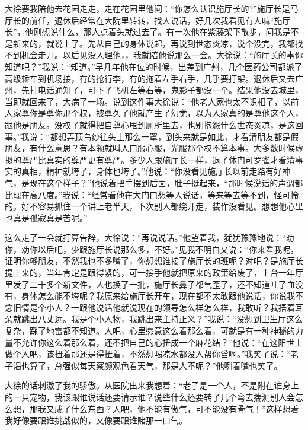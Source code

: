 \documentclass[12pt,oneside]{book}
\begin{document}
大徐要我陪他去花园走走，走在花园里他问：``你怎么认识施厅长的?''施厅长是马厅长的前任，退休后经常在大院里转转，找人说话，好几次我看见有人喊``施厅长''，他刚想说什么，那人点着头就过去了。有一次他在紫藤架下散步，问我是不是新来的，就说上了。先从自己的身体说起，再说到世态炎凉，说个没完，我都找不到机会走开。以后见没人理他，，我就陪他说那么一会。大徐说：``施厅长的事你知道吧？''我说：``知道。''早几年他在位的时候，出差到广州，几个医药公司都派了高级轿车到机场接，有的抢行李，有的拖着左手右手，几乎要打架。退休后又去广州，先打电话通知了，可下了飞机左等右等，鬼影子都没一个。结果他没去城里，当即就回来了，大病了一场。说到这件事大徐说：``他老人家也太不识相了，以前人家尊你是尊你那个权，被尊久了他就产生了幻觉，以为人家真的是尊他这个人，跟他是朋友。没权了就得把自尊心甩到厕所里去，也别抱怨什么世态炎凉，是这回事。''我说：``都想弄顶乌纱往头上那么一罩，到头来就是如此，才看清朋友都是假朋友，有什么意思？有本领就叫人口服心服，光服那个权不算本事。大多数时候虚拟的尊严比真实的尊严更有尊严。多少人跟施厅长一样，退了休门可罗雀才看清事实的真相，精神就垮了，身体也垮了。''他说：``你没看见施厅长以前走路有好神气，是现在这个样子？''他说着把手摆到后面，肚子挺起来，``那时候说话的声调都比现在高八度。''我说：``经常看他在大门口想等人说话，等来等去等不到，怪可怜的。好不容易抓住一个讲上老半天，下次别人都绕开走，装作没看见。想想他心里也真是孤寂真是苦呢。''

这么走了一会就打算告辞，大徐说：``再说说话。''他望着我，犹犹豫豫地说：``劝你，劝你以后吧，少跟施厅长说那么多，不好。''见我不明白又说：``你来看我呢，证明你够朋友，不然我也不多嘴了，你想想谁接了施厅长的班呢？对吧？是施厅长提上来的，当年肯定是跟得紧的，可一接手他就把原来的政策给废了，上台一年厅里发了二十多个新文件，人也换了一批，施厅长鼻子都气歪了，还不知道吐了血没有，身体怎么能不垮呢？我原来给施厅长开车，现在都不太敢跟他说话，你说我不念旧情是个小人？一跟他说话他就说现在的领导怎么样怎么样，我敢听？我捂着耳朵就跳出八丈远。我是个小人物，我跳出来主持正义？''我说：``没想到卫生厅这么复杂，踩了地雷都不知道。人吧，心里愿意这么着那么着，可就是有一种神秘的力量不允许你这么着那么着，还不把自己的心扭成一个麻花结？''他说：``在这阳世上做个人吧，该扭着那还是得扭着，不然想喝凉水都没人帮你舀啊。''我笑了说：``老子渴也算了，总强似每天察颜观色看天气，那是人不呢？''他咧着嘴也笑了。

大徐的话刺激了我的骄傲。从医院出来我想着：``老子是一个人，不是附在谁身上的一只宠物，我该跟谁说话还要请示谁？说些什么还要转了几个弯去揣测别人会怎么想，那我又成了什么东西？人吧，他不能有傲气，可不能没有骨气！''这样想着我好像要跟谁挑战似的，又像要跟谁赌那一口气。
\end{document}
